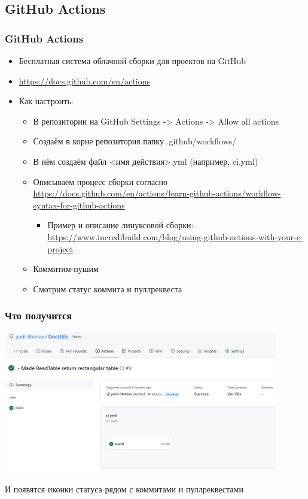 \documentclass{../../slides-style}
\begin{document}
    \subsection{GitHub Actions}

    \begin{frame}
        \frametitle{GitHub Actions}
        \begin{itemize}
            \item Бесплатная система облачной сборки для проектов на GitHub
            \item \url{https://docs.github.com/en/actions}
            \item Как настроить:
            \begin{itemize}
                \item В репозитории на GitHub Settings -> Actions -> Allow all actions
                \item Создаём в корне репозитория папку .github/workflows/
                \item В нём создаём файл <имя действия>.yml (например, ci.yml)
                \item Описываем процесс сборки согласно \url{https://docs.github.com/en/actions/learn-github-actions/workflow-syntax-for-github-actions}
                \begin{itemize}
                    \item Пример и описание линуксовой сборки: \url{https://www.incredibuild.com/blog/using-github-actions-with-your-c-project}
                \end{itemize}
                \item Коммитим-пушим
                \item Смотрим статус коммита и пуллреквеста
            \end{itemize}
        \end{itemize}
    \end{frame}

    \begin{frame}
        \frametitle{Что получится}
        \begin{center}
            \includegraphics[width=0.9\textwidth]{githubActionsBuildStatus}
        \end{center}
        И появятся иконки статуса рядом с коммитами и пуллреквестами
    \end{frame}
\end{document}
